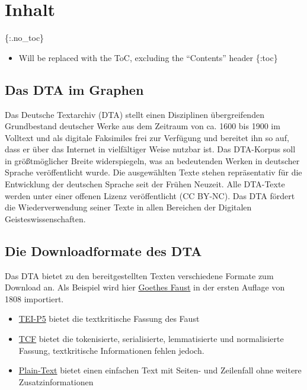 \documentclass[ngerman,]{scrreprt}
\providecommand{\tightlist}{%
  \setlength{\itemsep}{0pt}\setlength{\parskip}{0pt}}
\begin{document}
\chapter{Inhalt}\label{inhalt-5}

\{:.no\_toc\}

\begin{itemize}
\tightlist
\item
  Will be replaced with the ToC, excluding the ``Contents'' header \{:toc\}
\end{itemize}

\section{Das DTA im Graphen}\label{das-dta-im-graphen}

Das Deutsche Textarchiv (DTA) stellt einen Disziplinen übergreifenden Grundbestand deutscher Werke aus dem Zeitraum von ca. 1600 bis 1900 im Volltext und als digitale Faksimiles frei zur Verfügung und bereitet ihn so auf, dass er über das Internet in vielfältiger Weise nutzbar ist. Das DTA-Korpus soll in größtmöglicher Breite widerspiegeln, was an bedeutenden Werken in deutscher Sprache veröffentlicht wurde. Die ausgewählten Texte stehen repräsentativ für die Entwicklung der deutschen Sprache seit der Frühen Neuzeit. Alle DTA-Texte werden unter einer offenen Lizenz veröffentlicht (CC BY-NC). Das DTA fördert die Wiederverwendung seiner Texte in allen Bereichen der Digitalen Geisteswissenschaften.

\section{Die Downloadformate des DTA}\label{die-downloadformate-des-dta}

Das DTA bietet zu den bereitgestellten Texten verschiedene Formate zum Download an. Als Beispiel wird hier \href{http://deutschestextarchiv.de/book/show/goethe_faust01_1808}{Goethes Faust} in der ersten Auflage von 1808 importiert.

\begin{itemize}
\tightlist
\item
  \href{http://deutschestextarchiv.de/book/download_xml/goethe_faust01_1808}{TEI-P5} bietet die textkritische Fassung des Faust
\item
  \href{http://deutschestextarchiv.de/book/download_fulltcf/16181}{TCF} bietet die tokenisierte, serialisierte, lemmatisierte und normalisierte Fassung, textkritische Informationen fehlen jedoch.
\item
  \href{http://deutschestextarchiv.de/book/download_txt/goethe_faust01_1808}{Plain-Text} bietet einen einfachen Text mit Seiten- und Zeilenfall ohne weitere Zusatzinformationen
\end{itemize}
\end{document}
